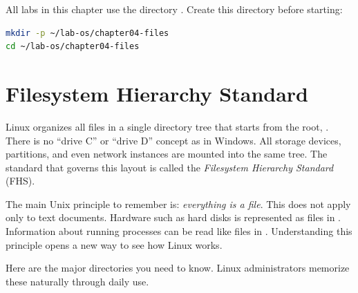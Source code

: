 \begin{notebox}
All labs in this chapter use the directory .
Create this directory before starting:
\begin{lstlisting}[language=bash]
mkdir -p ~/lab-os/chapter04-files
cd ~/lab-os/chapter04-files
\end{lstlisting}
\end{notebox}

\section{Filesystem Hierarchy Standard}
\label{sec:fhs}

Linux organizes all files in a single directory tree that starts from the root, \dir{/}. There is no ``drive C'' or ``drive D'' concept as in Windows. All storage devices, partitions, and even network  instances are mounted into the same tree. The standard that governs this layout is called the \textit{Filesystem Hierarchy Standard} (FHS).

The main Unix principle to remember is: \textit{everything is a file}. This does not apply only to text documents. Hardware such as hard disks is represented as files in . Information about running processes can be read like files in . Understanding this principle opens a new way to see how Linux works.

Here are the major directories you need to know. Linux administrators memorize these naturally through daily use.

